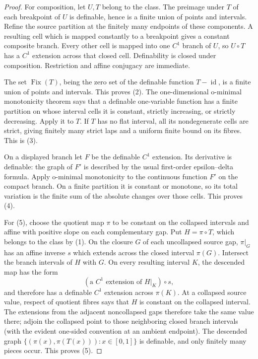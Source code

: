 \documentclass[11pt]{article}
\theoremstyle{definition}
\theoremstyle{remark}
\newcommand{\I}{[0,1]}
\newcommand{\Fix}{\operatorname{Fix}}
\newcommand{\id}{\operatorname{id}}
\begin{document}
\begin{proof}
For composition, let \(U,T\) belong to the class.  The preimage under \(T\)
of each breakpoint of \(U\) is definable, hence is a finite union of points
and intervals.  Refine the source partition at the finitely many endpoints of
these components.  A resulting cell which is mapped constantly to a
breakpoint gives a constant composite branch.  Every other cell is mapped
into one \(C^1\) branch of \(U\), so \(U\circ T\) has a \(C^1\) extension
across that closed cell.  Definability is closed under composition.
Restriction and affine conjugacy are immediate.

The set \(\Fix(T)\), being the zero set of the definable function
\(T-\id\), is a finite union of points and intervals.  This proves (2).
The one-dimensional o-minimal monotonicity theorem
\cite{vanDenDries} says that a definable
one-variable function has a finite partition on whose interval cells it is
constant, strictly increasing, or strictly decreasing.  Apply it to \(T\).
If \(T\) has no flat interval, all its nondegenerate cells are strict, giving
finitely many strict laps and a uniform finite bound on its fibres.  This is
(3).

On a displayed branch let \(F\) be the definable \(C^1\) extension.  Its
derivative is definable: the graph of \(F'\) is described by the usual
first-order epsilon--delta formula.  Apply o-minimal monotonicity to the
continuous function \(F'\) on the compact branch.  On a finite partition it
is constant or monotone, so its total variation is the finite sum of the
absolute changes over those cells.  This proves (4).

For (5), choose the quotient map \(\pi\) to be constant on the collapsed
intervals and affine with positive slope on each complementary gap.  Put
\(H=\pi\circ T\), which belongs to the class by (1).  On the closure \(G\)
of each uncollapsed source gap, \(\pi|_G\) has an affine inverse \(s\) which
extends across the closed interval \(\pi(G)\).  Intersect the branch
intervals of \(H\) with \(G\).  On every resulting interval \(K\), the
descended map has the form
\[
  (\text{a }C^1\text{ extension of }H|_K)\circ s,
\]
and therefore has a definable \(C^1\) extension across \(\pi(K)\).  At a
collapsed source value, respect of quotient fibres says that \(H\) is
constant on the collapsed interval.  The extensions from the adjacent
noncollapsed gaps therefore take the same value there; adjoin the collapsed
point to those neighboring closed branch intervals (with the evident
one-sided convention at an ambient endpoint).  The descended graph
\(\{(\pi(x),\pi(T(x))):x\in\I\}\) is definable, and only finitely many pieces
occur.  This proves (5).
\end{proof}
\end{document}
